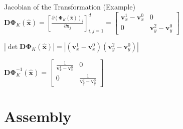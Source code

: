 \documentclass[xcolor=pdftex,table,10pt,yellow,mathserif]{beamer}
\begin{document}
\begin{frame}[t]{Jacobian of the Transformation (Example)}
    $\displaystyle
        \mathbf{D\Phi}_K(\hat{\boldsymbol{x}}) 
        = \left[ \frac{\partial (\mathbf{\Phi}_K(\hat{\boldsymbol{x}}))_i}{\partial \boldsymbol{x}_j} \right]^d_{i,j = 1}
        = \begin{bmatrix}
            \boldsymbol{v}^1_x - \boldsymbol{v}^0_x & 0 \\
            0 & \boldsymbol{v}^2_y - \boldsymbol{v}^0_y
        \end{bmatrix}
    $

    \vspace*{1cm}
    \pause

    $\displaystyle
        |\det \mathbf{D\Phi}_K(\hat{\boldsymbol{x}})|
        = |(\boldsymbol{v}^1_x - \boldsymbol{v}^0_x)(\boldsymbol{v}^2_y - \boldsymbol{v}^0_y)|
    $

    \vspace*{1cm}
    \pause

    $\displaystyle
        \mathbf{D\Phi}_K^{-1}(\hat{\boldsymbol{x}}) 
        = \begin{bmatrix}
            \frac{1}{\boldsymbol{v}^1_x - \boldsymbol{v}^0_x} & 0 \\
            0 & \frac{1}{\boldsymbol{v}^2_y - \boldsymbol{v}^0_y}
        \end{bmatrix}
    $
\end{frame}

\section{Assembly}
\end{document}

